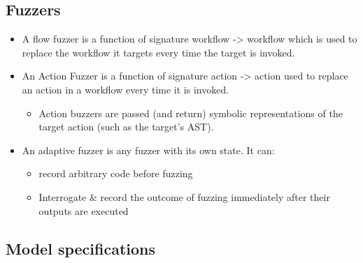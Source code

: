 \documentclass[11pt]{article}
\begin{document}
\subsection{Fuzzers}
\label{sec:orgb77484e}
\begin{itemize}
\item A flow fuzzer is a function of signature workflow -> workflow which is used to replace the workflow it targets every time the target is invoked.
\item An Action Fuzzer is a function of signature action -> action used to replace an action in a workflow every time it is invoked. 
\begin{itemize}
\item Action buzzers are passed (and return) symbolic representations of the target action (such as the target’s AST).
\end{itemize}
\item An adaptive fuzzer is any fuzzer with its own state. It can:
\begin{itemize}
\item record arbitrary code before fuzzing
\item Interrogate \& record the outcome of fuzzing immediately after their outputs are executed
\end{itemize}
\end{itemize}


\subsection{Model specifications}
\label{sec:org7a18e2f}
\end{document}

